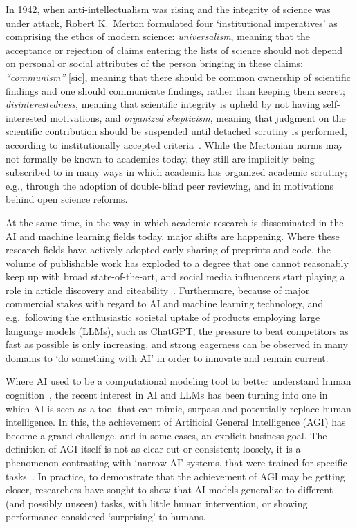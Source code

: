 \documentclass{article}
\theoremstyle{plain}
\theoremstyle{definition}
\theoremstyle{remark}
\begin{document}
In 1942, when anti-intellectualism was rising and the integrity of science was under attack, Robert K.\ Merton formulated four `institutional imperatives' as comprising the ethos of modern science: \emph{universalism}, meaning that the acceptance or rejection of claims entering the lists of science should not depend on personal or social attributes of the person bringing in these claims; \emph{``communism''} [sic], meaning that there should be common ownership of scientific findings and one should communicate findings, rather than keeping them secret; \emph{disinterestedness}, meaning that scientific integrity is upheld by not having self-interested motivations, and \emph{organized skepticism}, meaning that judgment on the scientific contribution should be suspended until detached scrutiny is performed, according to institutionally accepted criteria~\cite{merton1942science}. While the Mertonian norms may not formally be known to academics today, they still are implicitly being subscribed to in many ways in which academia has organized academic scrutiny; e.g., through the adoption of double-blind peer reviewing, and in motivations behind open science reforms.

At the same time, in the way in which academic research is disseminated in the AI and machine learning fields today, major shifts are happening. Where these research fields have actively adopted early sharing of preprints and code, the volume of publishable work has exploded to a degree that one cannot reasonably keep up with broad state-of-the-art, and social media influencers start playing a role in article discovery and citeability~\cite{weissburg2024tweets}. Furthermore, because of major commercial stakes with regard to AI and machine learning technology, and e.g.\ following the enthusiastic societal uptake of products employing large language models (LLMs), such as ChatGPT, the pressure to beat competitors as fast as possible is only increasing, and strong eagerness can be observed in many domains to `do something with AI' in order to innovate and remain current.

Where AI used to be a computational modeling tool to better understand human cognition~\cite{vanrooij2023aitheoretical}, the recent interest in AI and LLMs has been turning into one in which AI is seen as a tool that can mimic, surpass and potentially replace human intelligence. In this, the achievement of Artificial General Intelligence (AGI) has become a grand challenge, and in some cases, an explicit business goal. The definition of AGI itself is not as clear-cut or consistent; loosely, it is a phenomenon contrasting with `narrow AI' systems, that were trained for specific tasks~\cite{bubeck2023sparks}. In practice, to demonstrate that the achievement of AGI may be getting closer, researchers have sought to show that AI models generalize to different (and possibly unseen) tasks, with little human intervention, or showing performance considered `surprising' to humans.
\end{document}
